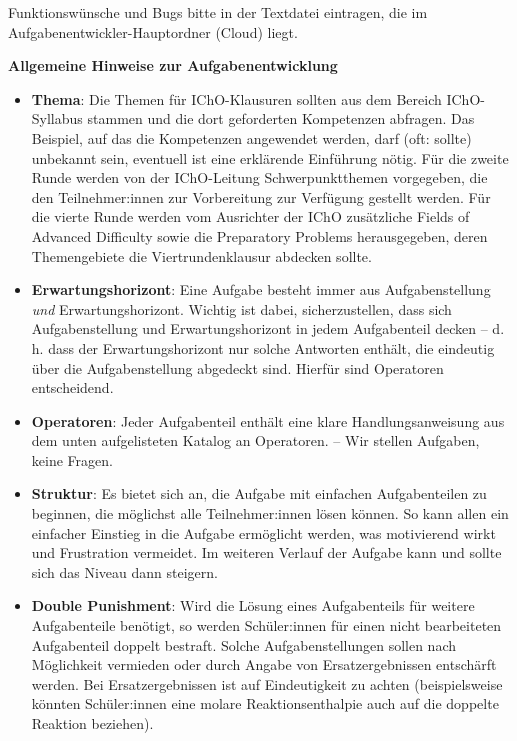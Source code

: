 \documentclass[./main.tex]{subfiles}
\begin{document}
\bigskip
Funktionsw\"unsche und Bugs bitte in der Textdatei eintragen, die im Aufgabenentwickler-Hauptordner (Cloud) liegt. 

\newpage
{\centering\textbf{Allgemeine Hinweise zur Aufgabenentwicklung}}
\begin{itemize}
    \item \textbf{Thema}: Die Themen f\"ur IChO-Klausuren sollten aus dem Bereich IChO-Syllabus stammen und die dort geforderten Kompetenzen abfragen. Das Beispiel, auf das die Kompetenzen angewendet werden, darf (oft: sollte) unbekannt sein, eventuell ist eine erkl\"arende Einf\"uhrung n\"otig. F\"ur die zweite Runde werden von der IChO-Leitung Schwerpunktthemen vorgegeben, die den Teilnehmer:innen zur Vorbereitung zur Verf\"ugung gestellt werden. F\"ur die vierte Runde werden vom Ausrichter der IChO zus\"atzliche \glqq{}Fields of Advanced Difficulty\grqq{} sowie die \glqq{}Preparatory Problems\grqq{} herausgegeben, deren Themengebiete die Viertrundenklausur abdecken sollte. 
    \item \textbf{Erwartungshorizont}: Eine Aufgabe besteht immer aus Aufgabenstellung \textit{und} Erwartungshorizont. Wichtig ist dabei, sicherzustellen, dass sich Aufgabenstellung und Erwartungshorizont in jedem Aufgabenteil decken -- d. h. dass der Erwartungshorizont nur solche Antworten enth\"alt, die eindeutig \"uber die Aufgabenstellung abgedeckt sind. Hierf\"ur sind Operatoren entscheidend. 
    \item \textbf{Operatoren}: Jeder Aufgabenteil enth\"alt eine klare Handlungsanweisung aus dem unten aufgelisteten Katalog an Operatoren. -- \glqq{}Wir stellen Aufgaben, keine Fragen.\grqq{}
    \item \textbf{Struktur}: Es bietet sich an, die Aufgabe mit einfachen Aufgabenteilen zu beginnen, die m\"oglichst alle Teilnehmer:innen l\"osen k\"onnen. So kann allen ein einfacher Einstieg in die Aufgabe erm\"oglicht werden, was motivierend wirkt und Frustration vermeidet. Im weiteren Verlauf der Aufgabe kann und sollte sich das Niveau dann steigern. 
    \item \textbf{Double Punishment}: Wird die L\"osung eines Aufgabenteils f\"ur weitere Aufgabenteile ben\"otigt, so werden Sch\"uler:innen f\"ur einen nicht bearbeiteten Aufgabenteil doppelt bestraft. Solche Aufgabenstellungen sollen nach M\"oglichkeit vermieden oder durch Angabe von Ersatzergebnissen entsch\"arft werden. Bei Ersatzergebnissen ist auf Eindeutigkeit zu achten (beispielsweise k\"onnten Sch\"uler:innen eine molare Reaktionsenthalpie auch auf die doppelte Reaktion beziehen).

\end{itemize}
\end{document}
